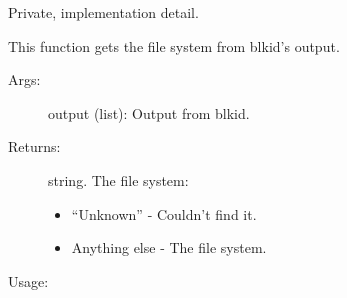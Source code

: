 \documentclass[letterpaper,10pt,english]{sphinxmanual}
\begin{document}
\begin{fulllineitems}
\label{\detokenize{cygwin:getdevinfo.cygwin.get_file_system}}
Private, implementation detail.

This function gets the file system from
blkid’s output.
\begin{description}
\item[{Args:}] \leavevmode
output (list):   Output from blkid.

\item[{Returns:}] \leavevmode
string. The file system:
\begin{itemize}
\item {} 
“Unknown”     - Couldn’t find it.

\item {} 
Anything else - The file system.

\end{itemize}

\end{description}

Usage:

\begin{sphinxVerbatim}[commandchars=\\\{\}]
  
\end{sphinxVerbatim}

\end{fulllineitems}

\end{document}
